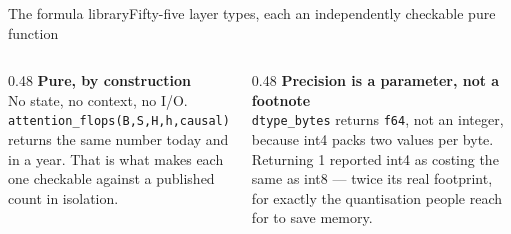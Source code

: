 \documentclass[aspectratio=169,11pt]{beamer}
\newcommand{\code}[1]{\texttt{\color{nxDeep}#1}}
\newcommand{\subtle}[1]{{\footnotesize\color{nxSlate}#1}}
\begin{document}
\begin{frame}{The formula library}{Fifty-five layer types, each an independently checkable pure function}
  \vspace{0.55cm}
  \begin{columns}[T]
    \begin{column}{0.48\textwidth}
      {\bfseries Pure, by construction}\\[5pt]
      \subtle{No state, no context, no I/O. \code{attention\_flops(B,S,H,h,causal)}
      returns the same number today and in a year. That is what makes each one
      checkable against a published count in isolation.}
    \end{column}
    \begin{column}{0.48\textwidth}
      {\bfseries Precision is a parameter, not a footnote}\\[5pt]
      \subtle{\code{dtype\_bytes} returns \code{f64}, not an integer, because
      int4 packs two values per byte. Returning 1 reported int4 as costing the
      same as int8 --- twice its real footprint, for exactly the quantisation
      people reach for to save memory.}
    \end{column}
  \end{columns}
\end{frame}
\end{document}
